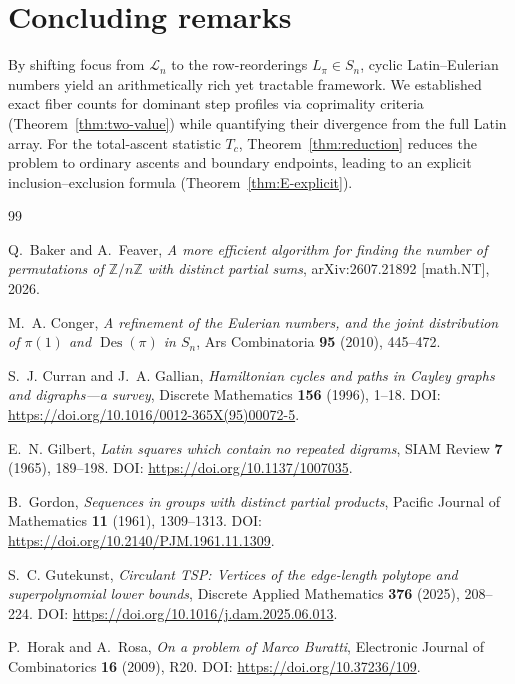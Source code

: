 \documentclass[11pt,a4paper]{amsart}
\newcommand{\1}{\mathbf{1}}
\begin{document}
\section{Concluding remarks}
By shifting focus from $\mathcal{L}_n$ to the row-reorderings $L_\pi \in S_n$, cyclic Latin--Eulerian numbers yield an arithmetically rich yet tractable framework. We established exact fiber counts for dominant step profiles via coprimality criteria (Theorem~\ref{thm:two-value}) while quantifying their divergence from the full Latin array. For the total-ascent statistic $T_c$, Theorem~\ref{thm:reduction} reduces the problem to ordinary ascents and boundary endpoints, leading to an explicit inclusion--exclusion formula (Theorem~\ref{thm:E-explicit}).
\begin{thebibliography}{99}

Q.~Baker and A.~Feaver,
\newblock \emph{A more efficient algorithm for finding the number of permutations of $\mathbb{Z}/n\mathbb{Z}$ with distinct partial sums},
\newblock arXiv:2607.21892 [math.NT], 2026.

M.~A. Conger,
\newblock \emph{A refinement of the Eulerian numbers, and the joint distribution of $\pi(1)$ and $\operatorname{Des}(\pi)$ in $S_n$},
\newblock Ars Combinatoria \textbf{95} (2010), 445--472.

S.~J. Curran and J.~A. Gallian,
\newblock \emph{Hamiltonian cycles and paths in Cayley graphs and digraphs---a survey},
\newblock Discrete Mathematics \textbf{156} (1996), 1--18.
\newblock DOI: \url{https://doi.org/10.1016/0012-365X(95)00072-5}.

E.~N. Gilbert,
\newblock \emph{Latin squares which contain no repeated digrams},
\newblock SIAM Review \textbf{7} (1965), 189--198.
\newblock DOI: \url{https://doi.org/10.1137/1007035}.

B.~Gordon,
\newblock \emph{Sequences in groups with distinct partial products},
\newblock Pacific Journal of Mathematics \textbf{11} (1961), 1309--1313.
\newblock DOI: \url{https://doi.org/10.2140/PJM.1961.11.1309}.

S.~C. Gutekunst,
\newblock \emph{Circulant TSP: Vertices of the edge-length polytope and superpolynomial lower bounds},
\newblock Discrete Applied Mathematics \textbf{376} (2025), 208--224.
\newblock DOI: \url{https://doi.org/10.1016/j.dam.2025.06.013}.

P.~Horak and A.~Rosa,
\newblock \emph{On a problem of Marco Buratti},
\newblock Electronic Journal of Combinatorics \textbf{16} (2009), R20.
\newblock DOI: \url{https://doi.org/10.37236/109}.


\end{thebibliography}
\end{document}
